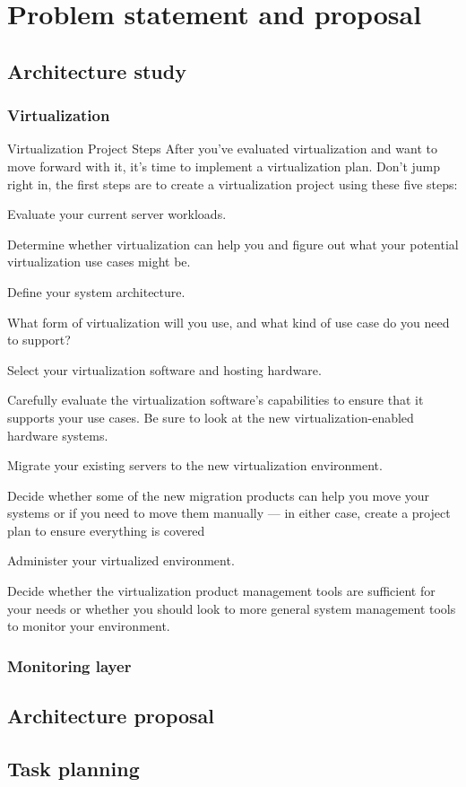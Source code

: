 \chapter{Problem statement and proposal}\label{B:problemStatementAndProposal}

\section{Architecture study}
\subsection{Virtualization}

Virtualization Project Steps
After you’ve evaluated virtualization and want to move forward with it, it’s time to implement a virtualization plan. Don’t jump right in, the first steps are to create a virtualization project using these five steps:

Evaluate your current server workloads.

Determine whether virtualization can help you and figure out what your potential virtualization use cases might be.

Define your system architecture.

What form of virtualization will you use, and what kind of use case do you need to support?

Select your virtualization software and hosting hardware.

Carefully evaluate the virtualization software’s capabilities to ensure that it supports your use cases. Be sure to look at the new virtualization-enabled hardware systems.

Migrate your existing servers to the new virtualization environment.

Decide whether some of the new migration products can help you move your systems or if you need to move them manually — in either case, create a project plan to ensure everything is covered

Administer your virtualized environment.

Decide whether the virtualization product management tools are sufficient for your needs or whether you should look to more general system management tools to monitor your environment.

\subsection{Monitoring layer}
\section{Architecture proposal}
\section{Task planning}



